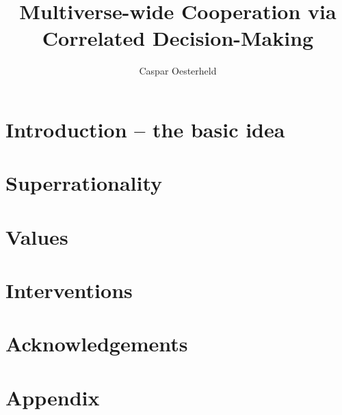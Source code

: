 \documentclass[]{article}
\title{Multiverse-wide Cooperation via Correlated Decision-Making}
\author{Caspar Oesterheld}
\date{}
\theoremstyle{plain}
\theoremstyle{plain}
\begin{document}
\maketitle

\begin{abstract}
\label{abstract}

\end{abstract}

\tableofcontents

\hypertarget{introduction-the-basic-idea}{\section{Introduction -- the
basic idea}\label{introduction-the-basic-idea}}


\hypertarget{superrationality}{\section{Superrationality}\label{superrationality}}


\hypertarget{values}{\section{Values}\label{values}}


\hypertarget{interventions}{\section{Interventions}\label{interventions}}


\section{Acknowledgements}\label{acknowledgements}


\section{Appendix}\label{appendix}



\begin{sloppypar} %
\printbibliography
\end{sloppypar}
\end{document}
